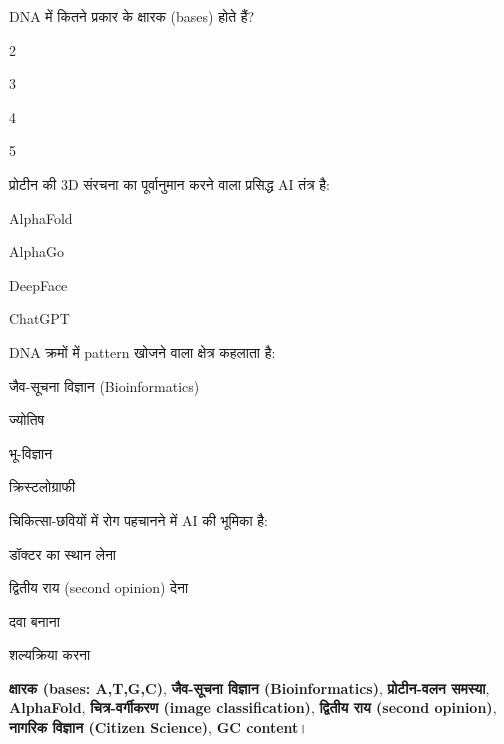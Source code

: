 \begin{mcq}
  \item DNA में कितने प्रकार के क्षारक (bases) होते हैं?
    \begin{choices}\item 2 \item 3 \item 4 \item 5\end{choices}
  \item प्रोटीन की 3D संरचना का पूर्वानुमान करने वाला प्रसिद्ध AI तंत्र है:
    \begin{choices}\item AlphaFold \item AlphaGo \item DeepFace \item ChatGPT\end{choices}
  \item DNA क्रमों में pattern खोजने वाला क्षेत्र कहलाता है:
    \begin{choices}\item जैव-सूचना विज्ञान (Bioinformatics) \item ज्योतिष
      \item भू-विज्ञान \item क्रिस्टलोग्राफी\end{choices}
  \item चिकित्सा-छवियों में रोग पहचानने में AI की भूमिका है:
    \begin{choices}\item डॉक्टर का स्थान लेना \item द्वितीय राय (second opinion) देना
      \item दवा बनाना \item शल्यक्रिया करना\end{choices}
\end{mcq}

\begin{mukhyashabd}
\textbf{क्षारक (bases: A,T,G,C)}, \textbf{जैव-सूचना विज्ञान (Bioinformatics)},
\textbf{प्रोटीन-वलन समस्या}, \textbf{AlphaFold}, \textbf{चित्र-वर्गीकरण (image classification)},
\textbf{द्वितीय राय (second opinion)}, \textbf{नागरिक विज्ञान (Citizen Science)},
\textbf{GC content}।
\end{mukhyashabd}
